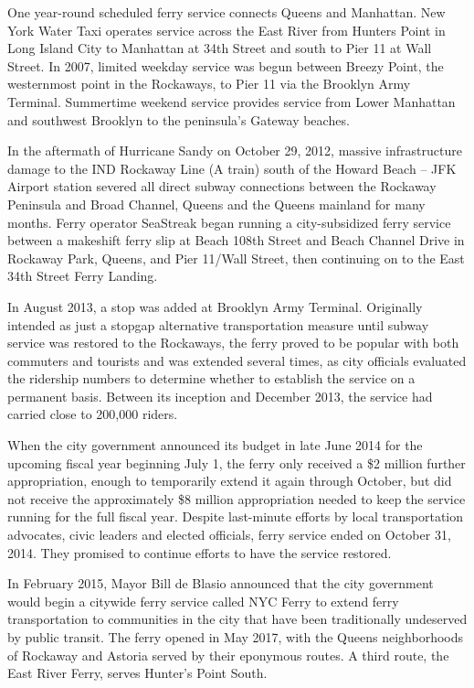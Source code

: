 One year-round scheduled ferry service connects Queens and Manhattan.
New York Water Taxi operates service across the East River from Hunters
Point in Long Island City to Manhattan at 34th Street and south to Pier
11 at Wall Street. In 2007, limited weekday service was begun between
Breezy Point, the westernmost point in the Rockaways, to Pier 11 via the
Brooklyn Army Terminal. Summertime weekend service provides service from
Lower Manhattan and southwest Brooklyn to the peninsula's Gateway
beaches.

In the aftermath of Hurricane Sandy on October 29, 2012, massive
infrastructure damage to the IND Rockaway Line (A train) south of the
Howard Beach -- JFK Airport station severed all direct subway
connections between the Rockaway Peninsula and Broad Channel, Queens and
the Queens mainland for many months. Ferry operator SeaStreak began
running a city-subsidized ferry service between a makeshift ferry slip
at Beach 108th Street and Beach Channel Drive in Rockaway Park, Queens,
and Pier 11/Wall Street, then continuing on to the East 34th Street
Ferry Landing.

In August 2013, a stop was added at Brooklyn Army Terminal. Originally
intended as just a stopgap alternative transportation measure until
subway service was restored to the Rockaways, the ferry proved to be
popular with both commuters and tourists and was extended several times,
as city officials evaluated the ridership numbers to determine whether
to establish the service on a permanent basis. Between its inception and
December 2013, the service had carried close to 200,000 riders.

When the city government announced its budget in late June 2014 for the
upcoming fiscal year beginning July 1, the ferry only received a \$2
million further appropriation, enough to temporarily extend it again
through October, but did not receive the approximately \$8 million
appropriation needed to keep the service running for the full fiscal
year. Despite last-minute efforts by local transportation advocates,
civic leaders and elected officials, ferry service ended on October 31,
2014. They promised to continue efforts to have the service restored.

In February 2015, Mayor Bill de Blasio announced that the city
government would begin a citywide ferry service called NYC Ferry to
extend ferry transportation to communities in the city that have been
traditionally undeserved by public transit. The ferry opened in May
2017, with the Queens neighborhoods of Rockaway and Astoria served by
their eponymous routes. A third route, the East River Ferry, serves
Hunter's Point South.

